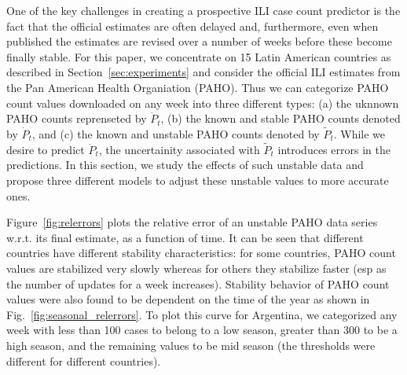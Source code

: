 One of the key challenges in creating a prospective ILI case count
predictor is the fact that the official estimates are often 
delayed and, furthermore, even when published the estimates are revised
over a number of weeks before these become finally stable.
For this paper, we concentrate on 15 Latin American countries 
as described in Section~\ref{sec:experiments} and consider the official 
ILI estimates from the Pan American Health Organiation (PAHO).%
Thus we can categorize PAHO count values downloaded on any week
into three different types: (a) the uknnown
PAHO counts reprenseted  by $\ddot{P}_t$, (b) the known and stable PAHO counts
denoted by $\dot{P}_t$, and (c) the known and unstable PAHO counts denoted by
$\tilde{P}_t$. While we desire to predict $\ddot{P}_t$, the uncertainity associated
with $\tilde{P}_t$ introduces errors in the predictions. In this section, 
we study the effects of such unstable data and propose 
three different models to adjust these unstable
values to more accurate ones.


Figure~\ref{fig:relerrors} plots the relative error of an unstable PAHO data series w.r.t.
its final estimate, as a function of time. It can be seen that different countries 
have different stability characteristics: 
for some countries, PAHO count values are
stabilized very slowly whereas for others they stabilize faster (esp as the number of
updates for a week increases).
Stability behavior of PAHO count values were also found to be dependent on the 
time of the year as shown in Fig.~\ref{fig:seasonal_relerrors}.
To plot this curve for Argentina, we categorized any week with less than 100 cases to belong to a low season,
greater than 300 to be a high season, and the remaining values to be mid season (the thresholds
were different for different countries).

